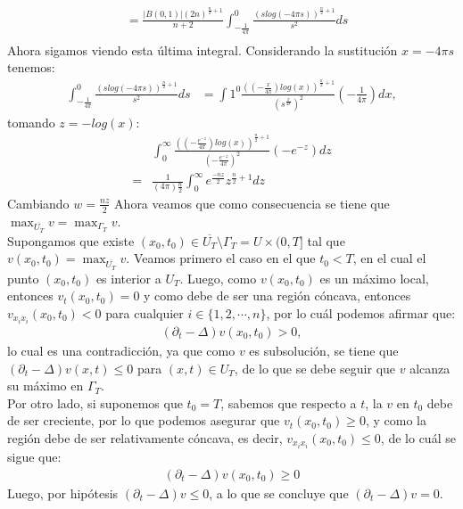 \begin{homeworkProblem}
\begin{solucion}
\begin{align*}
      &= \frac{|B(0,1)|(2n)^{\frac{n}{2} + 1}}{n+2} \int_{-\frac{1}{4\pi}}^{0} \frac{(slog(-4\pi s))^{\frac{n}{2} + 1}}{s^{2}} ds\\ 
    \end{align*}
    Ahora sigamos viendo esta última integral. Considerando la sustitución $x = -4\pi s$ tenemos:
    \begin{align*}
      \int_{-\frac{1}{4\pi}}^{0} \frac{(slog(-4\pi s))^{\frac{n}{2} + 1}}{s^{2}} ds &= \int{1}^{0} \frac{((-\frac{x}{4\pi})log(x))^{\frac{n}{2}+1}}{(s^\frac{x}{4\pi})^{2}}(- \frac{1}{4\pi})dx,
    \end{align*}
    tomando $z = -log(x)$:
    \begin{align*}
      &\int_{0}^{\infty} \frac{((-\frac{e^{-z}}{4\pi})log(x))^{\frac{n}{2}+1}}{(-\frac{e^{-z}}{4\pi})^{2}}(-e^{-z})dz\\
      =& \frac{1}{(4\pi){\frac{n}{2}}} \int_{0}^{\infty} e^{\frac{-nz}{2}}z^{\frac{n}{2}+1}dz
    \end{align*}
    Cambiando $w=\frac{nz}{2}$
    \demostrado
    Ahora veamos que como consecuencia se tiene que $\max_{\overline{U_T}}v=\max_{\Gamma_T}v$.\\
    Supongamos que existe $(x_0,t_0)\in\overline{U_T}\setminus\Gamma_T=U\times (0,T]$ tal que $v(x_0,t_0)=\max_{\overline{U_T}}v$. Veamos primero el caso en el que $t_0<T$, en el cual el punto $(x_0,t_0)$ es interior a $U_T$. Luego, como $v(x_0,t_0)$ es un máximo local, entonces $v_t(x_0,t_0)=0$ y como debe de ser una región cóncava, entonces $v_{x_ix_i}(x_0,t_0)<0$ para cualquier $i\in\{1,2,\cdots,n\}$, por lo cuál podemos afirmar que:
    \begin{align*}
      (\partial_t-\Delta)v(x_0,t_0)> 0,
    \end{align*}
    lo cual es una contradicción, ya que como $v$ es subsolución, se tiene que $(\partial_t-\Delta)v(x,t)\leq 0$ para $(x,t)\in U_T$, de lo que se debe seguir que $v$ alcanza su máximo en $\Gamma_T$.\\
    Por otro lado, si suponemos que $t_0=T$, sabemos que respecto a $t$, la $v$ en $t_0$ debe de ser creciente, por lo que podemos asegurar que $v_t(x_0,t_0)\geq 0$, y como la región debe de ser relativamente cóncava, es decir, $v_{x_ix_i}(x_0,t_0)\leq 0$, de lo cuál se sigue que:
    \begin{align*}
      (\partial_t-\Delta)v(x_0,t_0)\geq 0
    \end{align*}
    Luego, por hipótesis $(\partial_{t}-\Delta)v\leq 0$, a lo que se concluye que $(\partial_t-\Delta)v=0$.
  \end{solucion}  
\end{homeworkProblem}
